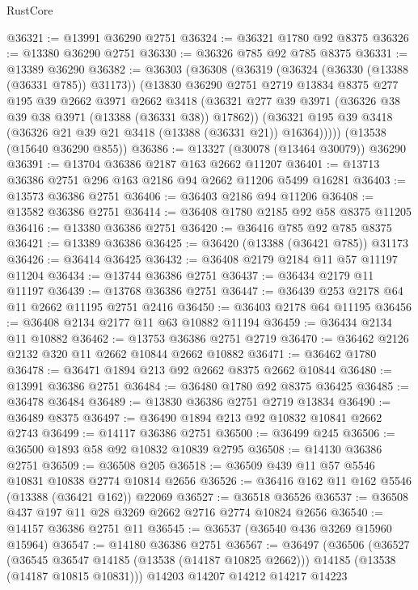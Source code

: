 \begin{lexlean}{RustCore}
\begin{coremodule}
@36321 := @13991 @36290 @2751
@36324 := @36321 @1780 @92 @8375
@36326 := @13380 @36290 @2751
@36330 := @36326 @785 @92 @785 @8375
@36331 := @13389 @36290
@36382 := @36303
    (@36308
      (@36319
        (@36324 (@36330 (@13388 (@36331 @785)) @31173))
        (@13830
          @36290
          @2751
          @2719
          @13834
          @8375
          @277
          @195
          @39
          @2662
          @3971
          @2662
          @3418
          (@36321 @277 @39 @3971 (@36326 @38 @39 @38 @3971 (@13388 (@36331 @38)) @17862))
          (@36321 @195 @39 @3418 (@36326 @21 @39 @21 @3418 (@13388 (@36331 @21)) @16364)))))
    (@13538 (@15640 @36290 @855))
@36386 := @13327 (@30078 (@13464 @30079)) @36290
@36391 := @13704 @36386 @2187 @163 @2662 @11207
@36401 := @13713 @36386 @2751 @296 @163 @2186 @94 @2662 @11206 @5499 @16281
@36403 := @13573 @36386 @2751
@36406 := @36403 @2186 @94 @11206
@36408 := @13582 @36386 @2751
@36414 := @36408 @1780 @2185 @92 @58 @8375 @11205
@36416 := @13380 @36386 @2751
@36420 := @36416 @785 @92 @785 @8375
@36421 := @13389 @36386
@36425 := @36420 (@13388 (@36421 @785)) @31173
@36426 := @36414 @36425
@36432 := @36408 @2179 @2184 @11 @57 @11197 @11204
@36434 := @13744 @36386 @2751
@36437 := @36434 @2179 @11 @11197
@36439 := @13768 @36386 @2751
@36447 := @36439 @253 @2178 @64 @11 @2662 @11195 @2751 @2416
@36450 := @36403 @2178 @64 @11195
@36456 := @36408 @2134 @2177 @11 @63 @10882 @11194
@36459 := @36434 @2134 @11 @10882
@36462 := @13753 @36386 @2751 @2719
@36470 := @36462 @2126 @2132 @320 @11 @2662 @10844 @2662 @10882
@36471 := @36462 @1780
@36478 := @36471 @1894 @213 @92 @2662 @8375 @2662 @10844
@36480 := @13991 @36386 @2751
@36484 := @36480 @1780 @92 @8375 @36425
@36485 := @36478 @36484
@36489 := @13830 @36386 @2751 @2719 @13834
@36490 := @36489 @8375
@36497 := @36490 @1894 @213 @92 @10832 @10841 @2662 @2743
@36499 := @14117 @36386 @2751
@36500 := @36499 @245
@36506 := @36500 @1893 @58 @92 @10832 @10839 @2795
@36508 := @14130 @36386 @2751
@36509 := @36508 @205
@36518 := @36509 @439 @11 @57 @5546 @10831 @10838 @2774 @10814 @2656
@36526 := @36416 @162 @11 @162 @5546 (@13388 (@36421 @162)) @22069
@36527 := @36518 @36526
@36537 := @36508 @437 @197 @11 @28 @3269 @2662 @2716 @2774 @10824 @2656
@36540 := @14157 @36386 @2751 @11
@36545 := @36537 (@36540 @436 @3269 @15960 @15964)
@36547 := @14180 @36386 @2751
@36567 := @36497
    (@36506
      (@36527
        (@36545 @36547 @14185 (@13538 (@14187 @10825 @2662)))
        @14185
        (@13538 (@14187 @10815 @10831)))
      @14203
      @14207
      @14212
      @14217
      @14223

\end{coremodule}
\end{lexlean}
